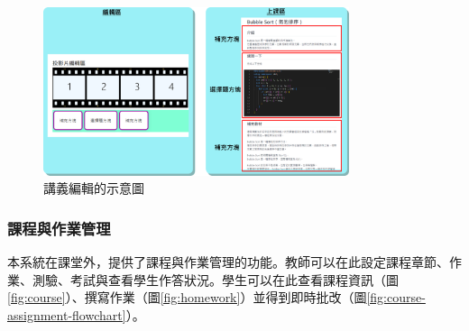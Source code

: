 \begin{enumerate}

  \begin{figure}[H]
    \centering
    \includegraphics[width=0.8\textwidth]{images/timezone.png}
    \caption{講義編輯的示意圖}
    \label{fig:edit}
  \end{figure}

\end{enumerate}

\subsubsection{課程與作業管理}
\label{sec:course-assignment}

本系統在課堂外，提供了課程與作業管理的功能。教師可以在此設定課程章節、作業、測驗、考試與查看學生作答狀況。學生可以在此查看課程資訊（圖\ref{fig:course}）、撰寫作業（圖\ref{fig:homework}）並得到即時批改（圖\ref{fig:course-assignment-flowchart}）。

